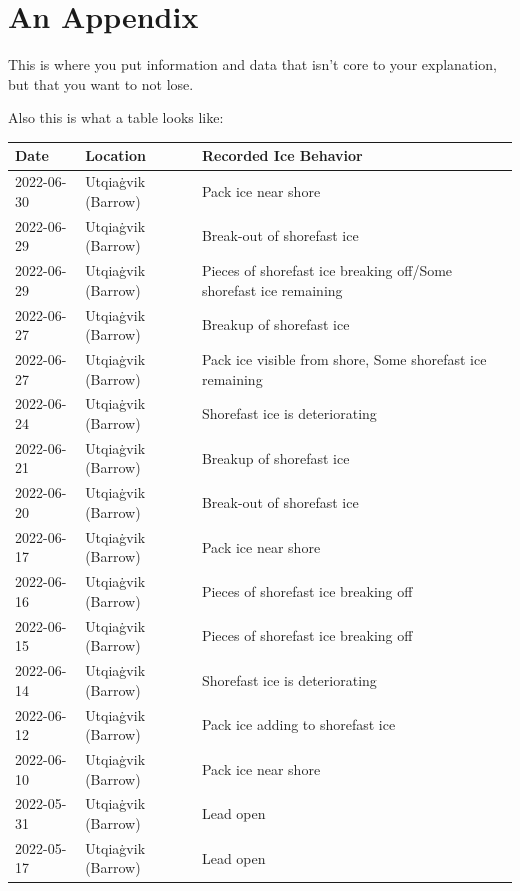 
\section{An Appendix}

This is where you put information and data that isn't core to your explanation, but that you want to not lose. 

Also this is what a table looks like: 


\begin{table}
    \centering
    \begin{tabular}{|l|l|l|}
    \hline
        \textbf{Date} & \textbf{Location} & \textbf{Recorded Ice Behavior} \\ \hline
        2022-06-30 & Utqiaġvik (Barrow) & Pack ice near shore \\ \hline
        2022-06-29 & Utqiaġvik (Barrow) & Break-out of shorefast ice \\ \hline
        2022-06-29 & Utqiaġvik (Barrow) & Pieces of shorefast ice breaking off/Some shorefast ice remaining\\ \hline
        2022-06-27 & Utqiaġvik (Barrow) & Breakup of shorefast ice \\ \hline
        2022-06-27 & Utqiaġvik (Barrow) & Pack ice visible from shore, Some shorefast ice remaining\\ \hline
        2022-06-24 & Utqiaġvik (Barrow) & Shorefast ice is deteriorating \\ \hline
        2022-06-21 & Utqiaġvik (Barrow) & Breakup of shorefast ice \\ \hline
        2022-06-20 & Utqiaġvik (Barrow) & Break-out of shorefast ice \\ \hline
        2022-06-17 & Utqiaġvik (Barrow) & Pack ice near shore \\ \hline
        2022-06-16 & Utqiaġvik (Barrow) & Pieces of shorefast ice breaking off \\ \hline
        2022-06-15 & Utqiaġvik (Barrow) & Pieces of shorefast ice breaking off \\ \hline
        2022-06-14 & Utqiaġvik (Barrow) & Shorefast ice is deteriorating \\ \hline
        2022-06-12 & Utqiaġvik (Barrow) & Pack ice adding to shorefast ice \\ \hline
        2022-06-10 & Utqiaġvik (Barrow) & Pack ice near shore \\ \hline
        2022-05-31 & Utqiaġvik (Barrow) & Lead open \\ \hline
        2022-05-17 & Utqiaġvik (Barrow) & Lead open \\ \hline

\end{tabular}
\end{table}
